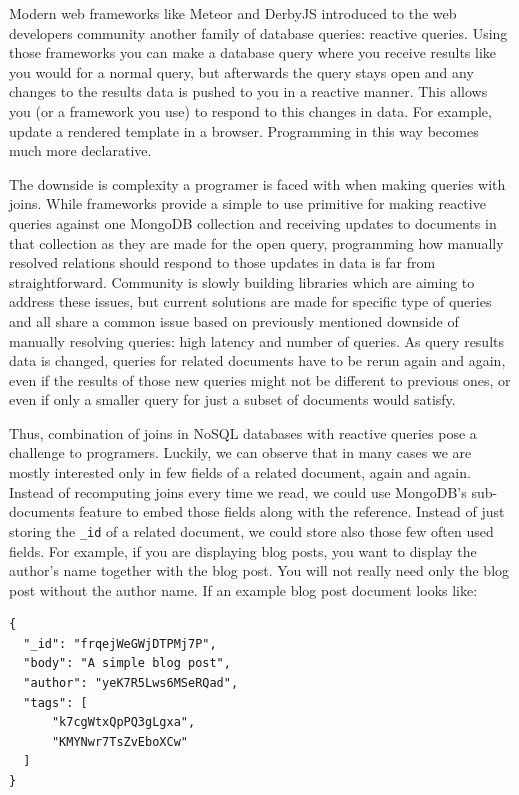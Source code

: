 Modern web frameworks like Meteor and DerbyJS introduced to the web developers community another family of database queries: reactive queries.
Using those frameworks you can make a database query where you receive results like you would for a normal query, but afterwards the query stays open and any changes to the results data is pushed to you in a reactive manner.
This allows you (or a framework you use) to respond to this changes in data.
For example, update a rendered template in a browser.
Programming in this way becomes much more declarative.

The downside is complexity a programer is faced with when making queries with joins.
While frameworks provide a simple to use primitive for making reactive queries against one MongoDB collection and receiving updates to documents in that collection as they are made for the open query, programming how manually resolved relations should respond to those updates in data is far from straightforward.
Community is slowly building libraries which are aiming to address these issues, but current solutions are made for specific type of queries and all share a common issue based on previously mentioned downside of manually resolving queries: high latency and number of queries.
As query results data is changed, queries for related documents have to be rerun again and again, even if the results of those new queries might not be different to previous ones, or even if only a smaller query for just a subset of documents would satisfy.

Thus, combination of joins in NoSQL databases with reactive queries pose a challenge to programers.
Luckily, we can observe that in many cases we are mostly interested only in few fields of a related document, again and again.
Instead of recomputing joins every time we read, we could use MongoDB's sub-documents feature to embed those fields along with the reference.
Instead of just storing the \verb|_id| of a related document, we could store also those few often used fields.
For example, if you are displaying blog posts, you want to display the author's name together with the blog post.
You will not really need only the blog post without the author name.
If an example blog post document looks like:

\begin{verbatim}
{
  "_id": "frqejWeGWjDTPMj7P",
  "body": "A simple blog post",
  "author": "yeK7R5Lws6MSeRQad",
  "tags": [
      "k7cgWtxQpPQ3gLgxa",
      "KMYNwr7TsZvEboXCw"
  ]
}
\end{verbatim}

